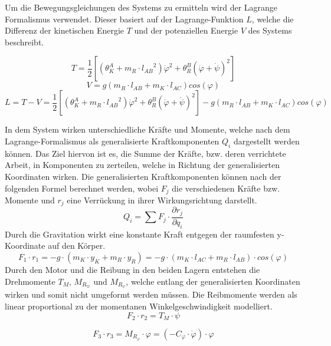 \newpage
Um die Bewegungsgleichungen des Systems zu ermitteln wird der Lagrange Formalismus verwendet. Dieser basiert auf der Lagrange-Funktion $L$, welche die Differenz der kinetischen Energie $T$ und der potenziellen Energie $V$ des Systems beschreibt.

\begin{equation}
T = \frac{1}{2}[({\theta}^A_K + m_R \cdot {l_{AB}}^2) {\dot{\varphi}}^2 + {\theta}^B_R(\dot{\varphi}+\dot{\psi})^2]
\end{equation}
\begin{equation}
V = g(m_R \cdot l_{AB} + m_K \cdot l_{AC})cos(\varphi)
\end{equation}
\begin{equation}
L = T - V = \frac{1}{2}[({\theta}^A_K + m_R \cdot {l_{AB}}^2) {\dot{\varphi}}^2 + {\theta}^B_R(\dot{\varphi}+\dot{\psi})^2] - g(m_R \cdot l_{AB} + m_K \cdot l_{AC})cos(\varphi)
\end{equation}

In dem System wirken unterschiedliche Kräfte und Momente, welche nach dem Lagrange-Formalismus als generalisierte Kraftkomponenten $Q_i$ dargestellt werden können. Das Ziel hiervon ist es, die Summe der Kräfte, bzw. deren verrichtete Arbeit, in Komponenten zu zerteilen, welche in Richtung der generalisierten Koordinaten wirken. Die generalisierten Kraftkomponenten können nach der folgenden Formel berechnet werden, wobei $F_j$ die verschiedenen Kräfte bzw. Momente und $r_j$ eine Verrückung in ihrer Wirkungsrichtung darstellt.
\begin{equation}
Q_i = \sum F_j \cdot \frac{\partial r_j}{\partial q_i} 
\end{equation}
Durch die Gravitation wirkt eine konstante Kraft entgegen der raumfesten y-Koordinate auf den Körper.
\begin{equation}
F_1 \cdot r_1 = -g \cdot (m_K \cdot y_K + m_R  \cdot y_R) = -g \cdot(m_K \cdot l_{AC} + m_R \cdot l_{AB}) \cdot cos(\varphi)
\end{equation}
Durch den Motor und die Reibung in den beiden Lagern entstehen die Drehmomente $T_M$, $M_{R_{\varpi}}$ und $M_{R_{\psi}}$, welche entlang der generalisierten Koordinaten wirken und somit nicht umgeformt werden müssen. Die Reibmomente werden als linear proportional zu der momentanen Winkelgeschwindigkeit modelliert.
\begin{equation}
F_2 \cdot r_2 = T_M \cdot \psi
\end{equation}

\begin{equation}
F_3 \cdot r_3 = M_{R_{\varphi}} \cdot \varphi = (-C_{\varphi} \cdot \dot{\varphi}) \cdot \varphi
\end{equation}

